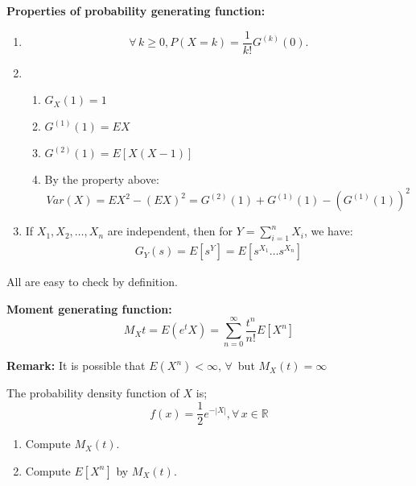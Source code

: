 \documentclass{article}
\begin{document}
\begin{theorem}
    \textbf{Properties of probability generating function:}
    \begin{enumerate}
        \item 
        \begin{equation*}
            \forall \, k \geq 0, P(X = k) = \frac{1}{k!}G^{(k)}(0).    
        \end{equation*}
        \item 
        \begin{enumerate}
            \item $G_X(1) = 1$
            \item $G^{(1)}(1) = EX$
            \item $G^{(2)}(1) = E[X(X-1)]$
            \item By the property above:
            \begin{equation*}
                Var(X) = EX^2 - (EX)^2 = G^{(2)}(1) + G^{(1)}(1) - (G^{(1)}(1))^2
            \end{equation*}
        \end{enumerate}
        \item If $X_1,X_2,\dots,X_n$ are independent, then for $Y = \sum^n_{i=1}X_i$, we have:
        \begin{align*}
            G_Y(s) = E[s^Y] = E[s^{X_1}\dots s^{X_n}]
        \end{align*}
    \end{enumerate}
\end{theorem}
All are easy to check by definition.





\begin{definition}
    \textbf{Moment generating function:}\\
    \begin{equation*}
        M_X{t} = E(e^tX) = \sum^\infty_{n=0}\frac{t^n}{n!}E[X^n]
    \end{equation*}
\end{definition}
\textbf{Remark:} It is possible that $E(X^n) < \infty, \,\forall\,$ but $M_X(t) = \infty$
\begin{quiz}
    The probability density function of $X$ is;
    \begin{equation*}
        f(x) = \frac{1}{2}e^{-|X|},\forall\, x \in \mathbb{R}
    \end{equation*}
    \begin{enumerate}
        \item Compute $M_X(t)$.
        \item Compute $E[X^n]$ by $M_X(t)$.
    \end{enumerate}
\end{quiz}
\end{document}
